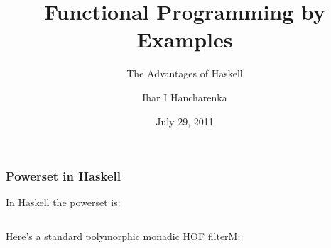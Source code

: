 \documentclass[compress,red]{beamer}
\title{Functional Programming by Examples}
\subtitle{The Advantages of Haskell}
\author{Ihar I Hancharenka}
\institute{EPAM Systems}
\date{July 29, 2011}
\begin{document}
\begin{frame}[containsverbatim]
\frametitle{Powerset in Haskell}
In Haskell the powerset is:
\begin{example}
	\small
	\inputminted{haskell}{src/powerset.hs}
\end{example}
Here's a standard polymorphic monadic HOF filterM:
\begin{example}
	\small
	\inputminted{haskell}{src/filterM_hof.hs}
\end{example}
\end{frame}
\end{document}
